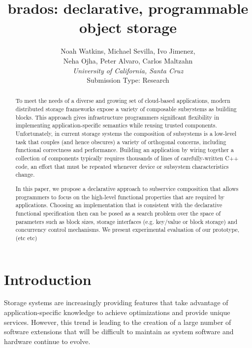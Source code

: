 \documentclass[10pt,twocolumn]{article}
\begin{document}
\title{brados: declarative, programmable object storage}

\author{
Noah Watkins, Michael Sevilla, Ivo Jimenez, \\Neha Ojha, Peter Alvaro, Carlos
Maltzahn\\
\small {\em University of California, Santa Cruz} \\
\small Submission Type: Research
}

\date{}
\maketitle

\begin{abstract}
To meet the needs of a diverse and growing set of cloud-based applications,
modern distributed storage frameworks expose a variety of composable
subsystems as building blocks.  This approach gives infrastructure programmers
significant flexibility in implementing application-specific semantics while
reusing trusted components.  Unfortunately, in current storage systems the
composition of subsystems is a low-level task that couples (and hence
obscures) a variety of orthogonal concerns, including functional correctness
and performance.  Building an application by wiring together a collection of
components typically requires thousands of lines of carefully-written C++
code, an effort that must be repeated whenever device or subsystem
characteristics change.

In this paper, we propose a declarative approach to subservice composition
that allows programmers to focus on the high-level functional properties that
are required by applications.  Choosing an implementation that is consistent
with the declarative functional specification then can be posed as a search
problem over the space of parameters such as block sizes, storage interfaces
(e.g. key/value or block storage) and concurrency control mechanisms.  We
present experimental evaluation of our prototype, (etc etc)
\end{abstract}

\section{Introduction}

Storage systems are increasingly providing features that take advantage of
application-specific knowledge to achieve optimizations and provide unique
services. However, this trend is leading to the creation of a large number of
software extensions that will be difficult to maintain as system software and
hardware continue to evolve.
\end{document}
